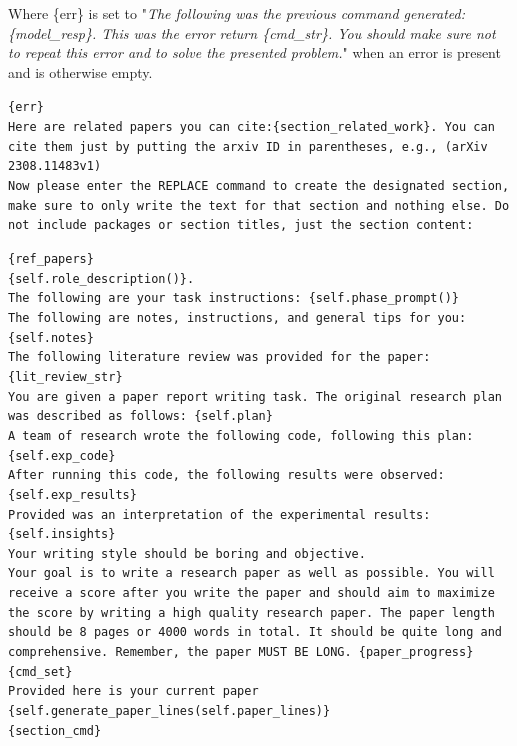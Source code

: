 \documentclass[11pt, a4paper]{gdm_format}
\begin{document}
Where \{err\} is set to "\textit{The following was the previous command generated: \{model\_resp\}. This was the error return \{cmd\_str\}. You should make sure not to repeat this error and to solve the presented problem.}" when an error is present and is otherwise empty.

\begin{tcolorbox}[breakable,colback=orange!5!white, colframe=orange!80!black, title=paper-solve Initial Report Generation Prompt]
\texttt{\{err\}\\Here are related papers you can cite:\{section\_related\_work\}. You can cite them just by putting the arxiv ID in parentheses, e.g., (arXiv 2308.11483v1)\\Now please enter the \textasciigrave\textasciigrave\textasciigrave REPLACE command to create the designated section, make sure to only write the text for that section and nothing else. Do not include packages or section titles, just the section content:}
\end{tcolorbox}



\begin{tcolorbox}[breakable,colback=orange!5!white, colframe=orange!80!black, title=paper-solve System Prompt]
\texttt{\{ref\_papers\}\\\{self.role\_description()\}.\\The following are your task instructions: \{self.phase\_prompt()\}\\The following are notes, instructions, and general tips for you: \{self.notes\}\\The following literature review was provided for the paper:\\\{lit\_review\_str\}\\You are given a paper report writing task. The original research plan was described as follows: \{self.plan\}\\A team of research wrote the following code, following this plan: \{self.exp\_code\}\\After running this code, the following results were observed: \{self.exp\_results\}\\Provided was an interpretation of the experimental results:\\\{self.insights\}\\Your writing style should be boring and objective.\\Your goal is to write a research paper as well as possible. You will receive a score after you write the paper and should aim to maximize the score by writing a high quality research paper. The paper length should be 8 pages or 4000 words in total. It should be quite long and comprehensive. Remember, the paper MUST BE LONG. \{paper\_progress\}\\\{cmd\_set\}\\Provided here is your current paper\\ \{self.generate\_paper\_lines(self.paper\_lines)\}\\\{section\_cmd\}}
\end{tcolorbox}
\end{document}
